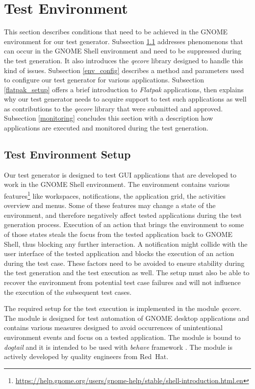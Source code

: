\section{Test Environment}\label{test_env}

This section describes conditions that need to be achieved in the GNOME environment for our test generator. Subsection \ref{test_ev_setup} addresses phenomenons that can occur in the GNOME Shell environment and need to be suppressed during the test generation. It also introduces the \textit{qecore} library designed to handle this kind of issues. Subsection \ref{env_config} describes a method and parameters used to configure our test generator for various applications. Subsection \ref{flatpak_setup} offers a brief introduction to \emph{Flatpak} applications, then explains why our test generator needs to acquire support to test such applications as well as contributions to the \textit{qecore} library that were submitted and approved. Subsection \ref{monitoring} concludes this section with a description how applications are executed and monitored during the test generation. 

\subsection{Test Environment Setup}\label{test_ev_setup}

Our test generator is designed to test GUI applications that are developed to work in the GNOME Shell environment. The environment contains various features\footnote{\url{https://help.gnome.org/users/gnome-help/stable/shell-introduction.html.en}} like workspaces, notifications, the application grid, the activities overview and menus. Some of these features may change a state of the environment, and therefore negatively affect tested applications during the test generation process. Execution of an action that brings the environment to some of those states steals the focus from the tested application back to GNOME Shell, thus blocking any further interaction. A notification might collide with the user interface of the tested application and blocks the execution of an action during the test case. These factors need to be avoided to ensure stability during the test generation and the test execution as well. The setup must also be able to recover the environment from potential test case failures and will not influence the execution of the subsequent test cases. 

The required setup for the test execution is implemented in the module \textit{qecore}. The module is designed for test automation of GNOME desktop applications and contains various measures designed to avoid occurrences of unintentional environment events and focus on a tested application. The module is bound to \textit{dogtail} and it is intended to be used with \textit{behave} framework \cite{qecore}. The module is actively developed by quality engineers from Red~Hat.

